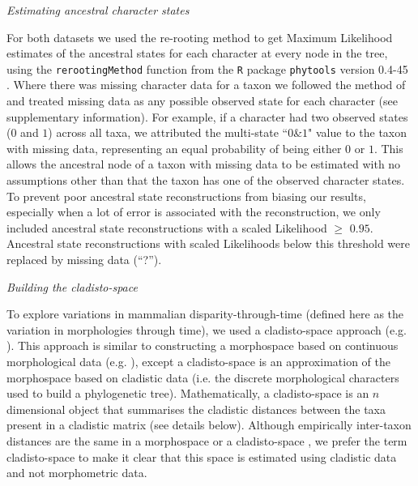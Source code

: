 \documentclass[12pt,letterpaper]{article}
\renewcommand{\subsection}[1]{%
\bigskip
\begin{center}
\begin{large}
\normalfont\itshape #1
\end{large}
\end{center}}
\begin{document}
\subsection{Estimating ancestral character states}
For both datasets we used the re-rooting method \cite{Yang01121995,Garland2000} to get Maximum Likelihood estimates of the ancestral states for each character at every node in the tree, using the \texttt{rerootingMethod} function from the \texttt{R} package \texttt{phytools} version 0.4-45 \cite{phytools,R}.
Where there was missing character data for a taxon we followed the method of \cite{Claddis} and treated missing data as any possible observed state for each character (see supplementary information).
For example, if a character had two observed states ($0$ and $1$) across all taxa, we attributed the multi-state ``$0$\&$1$" value to the taxon with missing data, representing an equal probability of being either $0$ or $1$.
This allows the ancestral node of a taxon with missing data to be estimated with no assumptions other than that the taxon has one of the observed character states.
To prevent poor ancestral state reconstructions from biasing our results, especially when a lot of error is associated with the reconstruction, we only included ancestral state reconstructions with a scaled Likelihood $\geq$ $0.95$.
Ancestral state reconstructions with scaled Likelihoods below this threshold were replaced by missing data (``?'').

\subsection{Building the cladisto-space}
To explore variations in mammalian disparity-through-time (defined here as the variation in morphologies through time), we used a cladisto-space approach (e.g. \cite{Brusatte12092008,friedmanexplosive2010,toljagictriassic-jurassic2013}).
This approach is similar to constructing a morphospace based on continuous morphological data (e.g. \cite{friedmanexplosive2010}), except a cladisto-space is an approximation of the morphospace based on cladistic data (i.e. the discrete morphological characters used to build a phylogenetic tree).
Mathematically, a cladisto-space is an $n$ dimensional object that summarises the cladistic distances between the taxa present in a cladistic matrix (see details below).
Although empirically inter-taxon distances are the same in a morphospace or a cladisto-space \cite{foth2012different,hetherington2015cladistic}, we prefer the term cladisto-space to make it clear that this space is estimated using cladistic data and not morphometric data.
\end{document}
